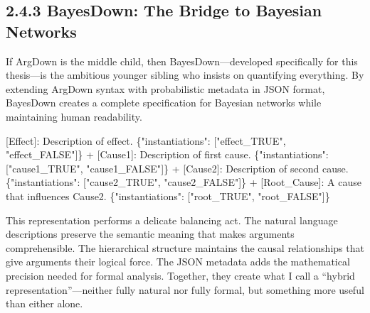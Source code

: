 \documentclass[
  11pt,
  letterpaper,
]{book}
\newenvironment{Shaded}{\begin{snugshade}}{\end{snugshade}}
\newcommand{\DataTypeTok}[1]{\textcolor[rgb]{0.68,0.00,0.00}{#1}}
\newcommand{\ErrorTok}[1]{\textcolor[rgb]{0.68,0.00,0.00}{#1}}
\newcommand{\FunctionTok}[1]{\textcolor[rgb]{0.28,0.35,0.67}{#1}}
\newcommand{\OtherTok}[1]{\textcolor[rgb]{0.00,0.23,0.31}{#1}}
\newcommand{\StringTok}[1]{\textcolor[rgb]{0.13,0.47,0.30}{#1}}
\begin{document}
\subsection{2.4.3 BayesDown: The Bridge to Bayesian
Networks}\label{sec-bayesdown}

If ArgDown is the middle child, then BayesDown---developed specifically
for this thesis---is the ambitious younger sibling who insists on
quantifying everything. By extending ArgDown syntax with probabilistic
metadata in JSON format, BayesDown creates a complete specification for
Bayesian networks while maintaining human readability.

\begin{Shaded}
\begin{Highlighting}[]
\OtherTok{[}\ErrorTok{Effect}\OtherTok{]}\ErrorTok{:} \ErrorTok{Description} \ErrorTok{of} \ErrorTok{effect.} \FunctionTok{\{}\DataTypeTok{"instantiations"}\FunctionTok{:} \OtherTok{[}\StringTok{"effect\_TRUE"}\OtherTok{,} \StringTok{"effect\_FALSE"}\OtherTok{]}\FunctionTok{\}}
 \ErrorTok{+} \OtherTok{[}\ErrorTok{Cause1}\OtherTok{]}\ErrorTok{:} \ErrorTok{Description} \ErrorTok{of} \ErrorTok{first} \ErrorTok{cause.} \FunctionTok{\{}\DataTypeTok{"instantiations"}\FunctionTok{:} \OtherTok{[}\StringTok{"cause1\_TRUE"}\OtherTok{,} \StringTok{"cause1\_FALSE"}\OtherTok{]}\FunctionTok{\}}
 \ErrorTok{+} \OtherTok{[}\ErrorTok{Cause2}\OtherTok{]}\ErrorTok{:} \ErrorTok{Description} \ErrorTok{of} \ErrorTok{second} \ErrorTok{cause.} \FunctionTok{\{}\DataTypeTok{"instantiations"}\FunctionTok{:} \OtherTok{[}\StringTok{"cause2\_TRUE"}\OtherTok{,} \StringTok{"cause2\_FALSE"}\OtherTok{]}\FunctionTok{\}}
   \ErrorTok{+} \OtherTok{[}\ErrorTok{Root\_Cause}\OtherTok{]}\ErrorTok{:} \ErrorTok{A} \ErrorTok{cause} \ErrorTok{that} \ErrorTok{influences} \ErrorTok{Cause2.} \FunctionTok{\{}\DataTypeTok{"instantiations"}\FunctionTok{:} \OtherTok{[}\StringTok{"root\_TRUE"}\OtherTok{,} \StringTok{"root\_FALSE"}\OtherTok{]}\FunctionTok{\}}
\end{Highlighting}
\end{Shaded}

This representation performs a delicate balancing act. The natural
language descriptions preserve the semantic meaning that makes arguments
comprehensible. The hierarchical structure maintains the causal
relationships that give arguments their logical force. The JSON metadata
adds the mathematical precision needed for formal analysis. Together,
they create what I call a ``hybrid representation''---neither fully
natural nor fully formal, but something more useful than either alone.
\end{document}
